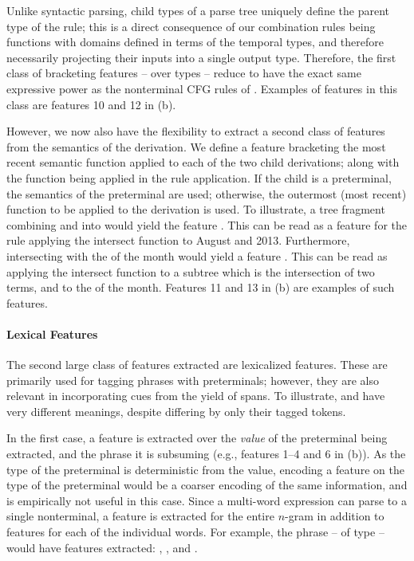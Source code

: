 Unlike syntactic parsing, child types of a parse tree
  uniquely define the parent type of the rule; this is a direct consequence
  of our combination rules being functions with domains defined in terms of the
  temporal types, and therefore necessarily projecting
  their inputs into a single output type.
Therefore, the first class of bracketing features -- over
  types -- reduce to have the exact same
  expressive power as the nonterminal CFG rules of \me.
Examples of features in this class are features 10 and 12
  in  (b).

However, we now also have the flexibility to extract a second class of features
  from the semantics of the derivation.
We define a feature bracketing the most recent semantic function
  applied to each of the two child derivations; along with the function being
  applied in the rule application.
If the child is a preterminal, the semantics of the preterminal are used;
  otherwise, the outermost (most recent) function to be applied to the
  derivation is used.
To illustrate, a tree fragment combining  and  into
   would yield the feature .
This can be read as a feature for the rule applying the intersect function
  to August and 2013.
Furthermore, intersecting  with the  of the month would
  yield a feature .
This can be read as applying the intersect function to a subtree which is
  the intersection of two terms, and to the  of the month.
Features 11 and 13 in  (b) are examples of such features.


\paragraph{Lexical Features}
The second large class of features extracted are lexicalized features.
These are primarily used for tagging phrases with preterminals;
  however, they are also relevant in incorporating cues from the yield
  of  spans.
To illustrate,  and  have very different meanings,
  despite differing by only their  tagged tokens.

In the first case, a feature is extracted over the \textit{value} of the
  preterminal being extracted, and the phrase it is subsuming
  (e.g., features 1--4 and 6 in  (b)).
As the type of the preterminal is deterministic from the value, encoding
  a feature on the type of the preterminal would be a coarser encoding of
  the same information, and is empirically not useful in this case.
Since a multi-word expression can parse to a single nonterminal, a feature
  is extracted for the entire $n$-gram in addition to features for each of the
  individual words.
For example, the phrase  -- of type  -- would have
  features extracted:
  ,
  , and
  .


